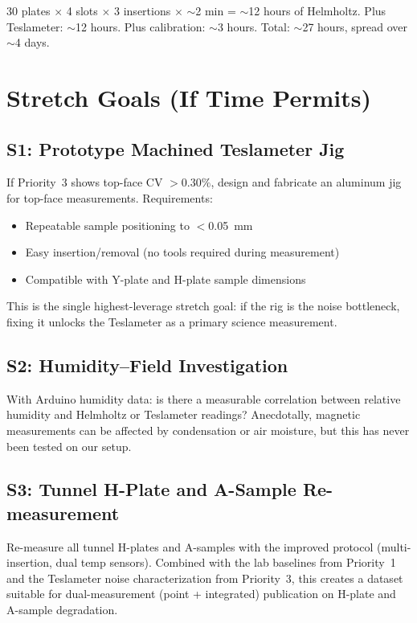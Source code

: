 \documentclass[11pt,letterpaper]{article}
\begin{document}
30 plates $\times$ 4 slots $\times$ 3 insertions $\times$ ${\sim}$2 min =
${\sim}$12 hours of Helmholtz. Plus Teslameter: ${\sim}$12 hours. Plus
calibration: ${\sim}$3 hours. Total: ${\sim}$27 hours, spread over ${\sim}$4
days.


\section{Stretch Goals (If Time Permits)}
\label{sec:stretch}

\subsection{S1: Prototype Machined Teslameter Jig}

If Priority~3 shows top-face CV $> 0.30\%$, design and fabricate an aluminum jig
for top-face measurements. Requirements:
\begin{itemize}[nosep]
  \item Repeatable sample positioning to $<$\SI{0.05}{\milli\meter}
  \item Easy insertion/removal (no tools required during measurement)
  \item Compatible with Y-plate and H-plate sample dimensions
\end{itemize}

This is the single highest-leverage stretch goal: if the rig is the noise
bottleneck, fixing it unlocks the Teslameter as a primary science measurement.

\subsection{S2: Humidity--Field Investigation}

With Arduino humidity data: is there a measurable correlation between relative
humidity and Helmholtz or Teslameter readings? Anecdotally, magnetic measurements
can be affected by condensation or air moisture, but this has never been tested
on our setup.

\subsection{S3: Tunnel H-Plate and A-Sample Re-measurement}

Re-measure all tunnel H-plates and A-samples with the improved protocol
(multi-insertion, dual temp sensors). Combined with the lab baselines from
Priority~1 and the Teslameter noise characterization from Priority~3, this
creates a dataset suitable for dual-measurement (point + integrated) publication
on H-plate and A-sample degradation.
\end{document}
